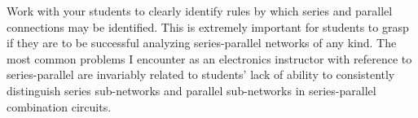 





Work with your students to clearly identify rules by which series and parallel connections may be identified.  This is extremely important for students to grasp if they are to be successful analyzing series-parallel networks of any kind.  The most common problems I encounter as an electronics instructor with reference to series-parallel are invariably related to students' lack of ability to consistently distinguish series sub-networks and parallel sub-networks in series-parallel combination circuits.




